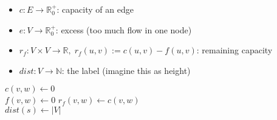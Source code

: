 \documentclass{article}
\begin{document}
\begin{preview}
    \begin{itemize}
        \item $c:E \rightarrow \mathbb{R}_0^+$: capacity of an edge
        \item $e: V \rightarrow \mathbb{R}_0^+$: excess (too much flow in one node)
        \item $r_f: V \times V \rightarrow \mathbb{R}, \; r_f(u,v) := c(u,v) - f(u,v) $: remaining capacity 
        \item $dist: V \rightarrow \mathbb{N}$: the label (imagine this as height)
    \end{itemize}

    \begin{algorithm}[H]
        \begin{algorithmic}
                 
                    \State $c(v,w) \gets 0$ 
                \EndFor
                \\
                 
                    \State $f(v,w) \gets 0$ 
                    \State $r_f(v,w) \gets c(v,w)$  
                \EndFor
                \\
                \State $dist(s) \gets |V|$


\end{algorithmic}
\end{algorithm}
\end{preview}
\end{document}
